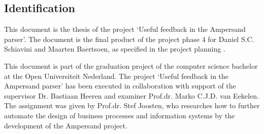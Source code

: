 
\subsection{Identification}
This document is the thesis of the project `Useful feedback in the Ampersand parser'.
The document is the final product of the project phase 4 for Daniel S.C. Schiavini and Maarten Baertsoen, as specified in the project planning .

This document is part of the graduation project of the computer science bachelor at the Open Universiteit Nederland.
The project `Useful feedback in the Ampersand parser' has been executed in collaboration with support of the supervisor Dr. Bastiaan Heeren and examiner Prof.dr. Marko C.J.D. van Eekelen.
The assignment was given by Prof.dr. Stef Joosten, who researches how to further automate the design of business processes and information systems by the development of the Ampersand project.
